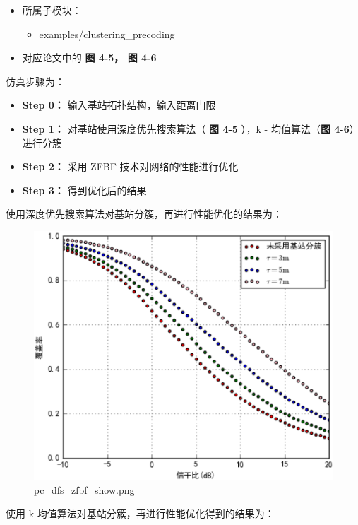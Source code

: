 \documentclass[11pt]{article}
\makeatletter
\def\maxwidth{\ifdim\Gin@nat@width>\linewidth\linewidth
    \else\Gin@nat@width\fi}
\let\Oldincludegraphics\includegraphics
\renewcommand{\includegraphics}[1]{\Oldincludegraphics[width=.8\maxwidth]{#1}}
\providecommand{\tightlist}{%
      \setlength{\itemsep}{0pt}\setlength{\parskip}{0pt}}
\makeatother
\begin{document}
\begin{itemize}
\tightlist
\item
  所属子模块：

  \begin{itemize}
  \tightlist
  \item
    examples/clustering\_precoding
  \end{itemize}
\item
  对应论文中的 \textbf{图 4-5， 图 4-6}
\end{itemize}

仿真步骤为：

\begin{itemize}
\tightlist
\item
  \textbf{Step 0：} 输入基站拓扑结构，输入距离门限
\item
  \textbf{Step 1：} 对基站使用深度优先搜索算法（ \textbf{图 4-5} ），k -
  均值算法（\textbf{图 4-6}）进行分簇
\item
  \textbf{Step 2：} 采用 ZFBF 技术对网络的性能进行优化
\item
  \textbf{Step 3：} 得到优化后的结果
\end{itemize}

使用深度优先搜索算法对基站分簇，再进行性能优化的结果为：

\begin{figure}[htbp]
\centering
\includegraphics{pc_dfs_zfbf_show.png}
\caption{pc\_dfs\_zfbf\_show.png}
\end{figure}

使用 k 均值算法对基站分簇，再进行性能优化得到的结果为：
\end{document}
